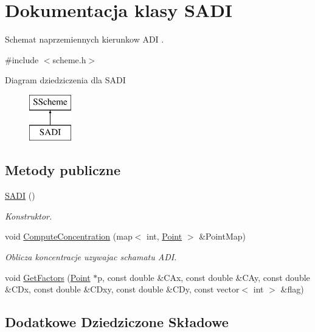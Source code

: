 \hypertarget{class_s_a_d_i}{}\section{Dokumentacja klasy S\+A\+D\+I}
\label{class_s_a_d_i}


Schemat naprzemiennych kierunkow A\+D\+I .  




{\ttfamily \#include $<$scheme.\+h$>$}

Diagram dziedziczenia dla S\+A\+D\+I\begin{figure}[H]
\begin{center}
\leavevmode
\includegraphics[height=2.000000cm]{class_s_a_d_i}
\end{center}
\end{figure}
\subsection*{Metody publiczne}
\begin{DoxyCompactItemize}
\item 
\hyperlink{class_s_a_d_i_a77c5520329e29fff358d98b9c7f323a7}{S\+A\+D\+I} ()
\begin{DoxyCompactList}\small\item\em Konstruktor. \end{DoxyCompactList}\item 
void \hyperlink{class_s_a_d_i_aed849c2b3b1a1c5b346edcfb69460457}{Compute\+Concentration} (map$<$ int, \hyperlink{class_point}{Point} $>$ \&Point\+Map)
\begin{DoxyCompactList}\small\item\em Oblicza koncentracje uzywajac schamatu A\+D\+I. \end{DoxyCompactList}\item 
void \hyperlink{class_s_a_d_i_aec6b8007d89c0c72648b4cad7aba1274}{Get\+Factors} (\hyperlink{class_point}{Point} $\ast$p, const double \&C\+Ax, const double \&C\+Ay, const double \&C\+Dx, const double \&C\+Dxy, const double \&C\+Dy, const vector$<$ int $>$ \&flag)
\end{DoxyCompactItemize}
\subsection*{Dodatkowe Dziedziczone Składowe}


